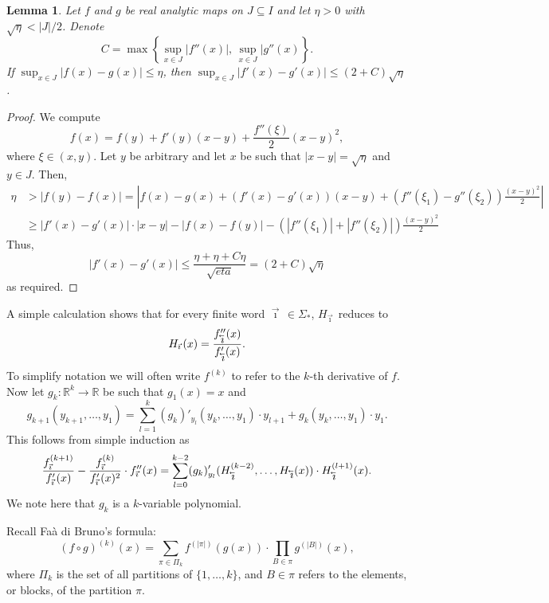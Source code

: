 \documentclass[12pt,]{article}
\newtheorem{lemma}[theorem]{Lemma}
\theoremstyle{definition}
\theoremstyle{remark}
\renewcommand{\Bbb}[1]{\mathbb{#1}}
\newcommand{\bbR}{{\Bbb R}}        %
\newcommand{\0}{\mathbf{0}}
\newcommand{\cev}[1]{\reflectbox{\ensuremath{\vec{\reflectbox{\ensuremath{#1}}}}}}
\newcommand{\bi}{\vec{\imath}\,}
\newcommand{\bbi}{\,\cev{\imath}}
\begin{document}
\begin{lemma}\label{thm:analyticity}
  Let $f$ and $g$ be real analytic maps on $J\subseteq I$
  and let $\eta>0$ with $\sqrt{\eta}<|J|/2$.
  Denote
  \[
    C = \max\left\{\sup_{x\in J} |f''(x)|,\, \sup_{x\in J}|g''(x)\right\}.
  \]
  If $\sup_{x\in J} |f(x)-g(x)| \leq \eta$, then $\sup_{x\in J} |f'(x)-g'(x)|\leq (2+C)\sqrt{\eta}$.
\end{lemma}
\begin{proof}
  We compute
  \[
    f(x) = f(y) + f'(y)(x-y)+ \frac{f''(\xi)}{2}(x-y)^2,
  \]
  where $\xi\in(x,y)$.
  Let $y$ be arbitrary and let $x$ be such that $|x-y|=\sqrt{\eta}$ and $y\in J$.
  Then,
  \begin{align*}
    \eta &> |f(y)-f(x)| =
    \left|f(x)-g(x)+(f'(x)-g'(x))(x-y)+(f''(\xi_1)-g''(\xi_2))\frac{(x-y)^2}{2}\right|\\
	 &\geq |f'(x)-g'(x)|\cdot|x-y|-|f(x)-f(y)|-(|f''(\xi_1)|+|f''(\xi_2)|)\frac{(x-y)^2}{2}
  \end{align*}
  Thus,
  \[
    |f'(x)-g'(x)| \leq \frac{\eta+\eta+C \eta}{\sqrt{eta}} = (2+C)\sqrt{\eta}
  \]
  as required.
\end{proof}
A simple calculation shows that for every finite word $\bi\in\Sigma_*$, $H_{\bi}$ reduces to
\[
  H_{\bi}(x) = \frac{f''_{\bbi}(x)}{f'_{\bbi}(x)}.
\]
To simplify notation we will often write $f^{(k)}$ to refer to the $k$-th derivative of $f$.
Now let $g_k:\bbR^k\to \bbR$ be such that $g_1(x)=x$ and 
\[
  g_{k+1}(y_{k+1},\dots,y_1)=\sum_{l=1}^k (g_k)'_{y_l}(y_k,\dots,y_1)\cdot y_{l+1} +
  g_k(y_k,\dots,y_1)\cdot y_1.
\]
This follows from simple induction as
\[
  \frac{f_{\bi}^{(k+1)}}{f_{\bi}'(x)} - \frac{f_{\bi}^{(k)}}{f_{\bi}'(x)^2}\cdot f_{\bi}''(x)
  =\sum_{l=0}^{k-2}(g_k)'_{y_l}(H_{\bbi}^{(k-2)},\dots,H_{\bbi}(x)) \cdot H_{\bbi}^{(l+1)}(x).
\]
We note here that $g_k$ is a $k$-variable polynomial.

Recall Fa\`a di Bruno's formula:
\[
  (f\circ g)^{(k)}(x) = \sum_{\pi\in \Pi_k} f^{(|\pi|)}(g(x)) \cdot \prod_{B\in\pi}
  g^{(|B|)}(x),
\]
where $\Pi_k$ is the set of all partitions of $\{1,\dots,k\}$, and $B\in \pi$ refers to the
elements, or blocks, of the partition $\pi$.
\end{document}
